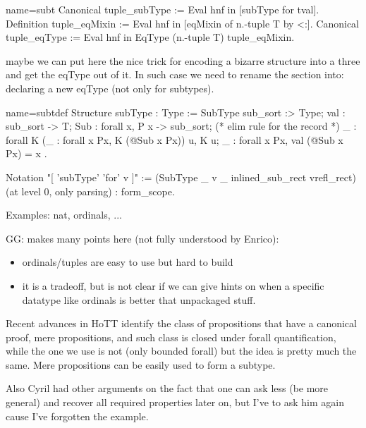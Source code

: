 \begin{coq}{name=subt}{}
Canonical tuple_subType := Eval hnf in [subType for tval].
Definition tuple_eqMixin := Eval hnf in [eqMixin of n.-tuple T by <:].
Canonical tuple_eqType := Eval hnf in EqType (n.-tuple T) tuple_eqMixin.
\end{coq}

maybe we can put here the nice trick for encoding a bizarre structure
into a three and get the eqType out of it.  In such case we need to
rename the section into: declaring a new eqType (not only for
subtypes).


\begin{coq}{name=subtdef}{}
Structure subType : Type := SubType {
  sub_sort :> Type;
  val : sub_sort -> T;
  Sub : forall x, P x -> sub_sort;
  (* elim rule for the record *)
  _ : forall K (_ : forall x Px, K (@Sub x Px)) u, K u;
  _ : forall x Px, val (@Sub x Px) = x
}.

Notation "[ 'subType' 'for' v ]" := (SubType _ v _ inlined_sub_rect vrefl_rect)
 (at level 0, only parsing) : form_scope.
\end{coq}


\mcbREQUIRE{}


Examples: nat, ordinals, ...

GG: makes many points here (not fully understood by Enrico):
\begin{itemize}
\item ordinals/tuples are easy to use but hard to build
\item it is a tradeoff, but is not clear if we can give hints on when
	a specific datatype like ordinals is better that unpackaged
	stuff.
\end{itemize}

\mcbPROVIDE{}
\mcbREQUIRE{}

Recent advances in HoTT identify the class of propositions that have a
canonical proof, mere propositions, and such class is closed under
forall quantification, while the one we use is not (only bounded
forall) but the idea is pretty much the same.  Mere propositions can
be easily used to form a subtype.

Also Cyril had other arguments on the fact that one can
ask less (be more general) and recover all required properties later
on, but I've to ask him again cause I've forgotten the example.
